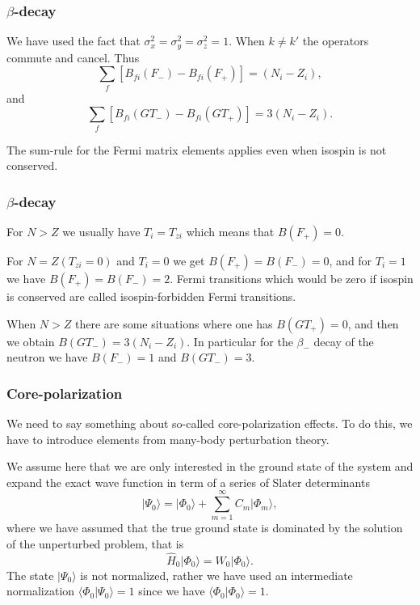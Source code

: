 \documentclass{beamer}
\begin{document}
\begin{frame}
\frametitle{$\beta$-decay}

\begin{block}{}
We have used the fact that $\sigma ^{2}_{x} = \sigma ^{2}_{y}=\sigma ^{2}_{z}=1$.
When $k \neq k'$ the operators commute and cancel.
Thus
\[
\sum_{f} \left[B_{fi}(F_{-}) - B_{fi}(F_{+}) \right] = (N_{i}-Z_{i}),       
\]
and
\[
\sum_{f} \left[ B_{fi}(GT_{-}) - B_{fi}(GT_{+}) \right] = 3(N_{i}-Z_{i}).       
\]

The sum-rule for the Fermi matrix elements applies even
when isospin is not conserved.
\end{block}
\end{frame}

\begin{frame}
\frametitle{$\beta$-decay}

\begin{block}{}
For $N > Z$ we usually have
$T_{i}=T_{zi}$ which means that $B(F_{+})=0$.

For $N=Z (T_{zi}=0)$ and $T_{i}=0$ we get 
$B(F_{+})=B(F_{-})=0$, and for $T_{i}=1$ we
have $B(F_{+}) = B(F_{-}) = 2$. Fermi transitions which would be zero
if isospin is conserved are called isospin-forbidden Fermi transitions.

When $N > Z$ there are some situations where one has $B(GT_{+})=0$,
and then we obtain $B(GT_{-}) = 3(N_{i}-Z_{i})$. In particular
for the $\beta_{-}$ decay of the neutron we have $B(F_{-})=1$
and $B(GT_{-})=3$.
\end{block}
\end{frame}

\begin{frame}
\frametitle{Core-polarization}

\begin{block}{}
We need to say something about so-called core-polarization effects.
To do this, we have to introduce elements from many-body perturbation theory.

We assume here that we are only interested in the ground state of the system and 
expand the exact wave function in term of a series of Slater determinants
\[
\vert \Psi_0\rangle = \vert \Phi_0\rangle + \sum_{m=1}^{\infty}C_m\vert \Phi_m\rangle,
\]
where we have assumed that the true ground state is dominated by the 
solution of the unperturbed problem, that is
\[
\hat{H}_0\vert \Phi_0\rangle= W_0\vert \Phi_0\rangle.
\]
The state $\vert \Psi_0\rangle$ is not normalized, rather we have used an intermediate 
normalization $\langle \Phi_0 \vert \Psi_0\rangle=1$ since we have $\langle \Phi_0\vert \Phi_0\rangle=1$. 
\end{block}
\end{frame}
\end{document}
